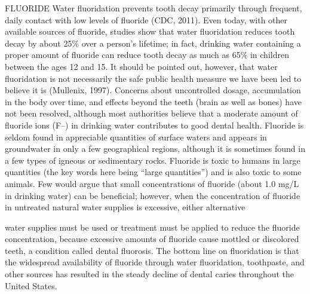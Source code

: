 \documentclass{article}
\begin{document}
FLUORIDE Water fluoridation prevents tooth decay primarily through
frequent, daily contact with low levels of fluoride (CDC, 2011). Even
today, with other available sources of fluoride, studies show that water
fluoridation reduces tooth decay by about 25\% over a person's lifetime;
in fact, drinking water containing a proper amount of fluoride can
reduce tooth decay as much as 65\% in children between the ages 12 and
15. It should be pointed out, however, that water fluoridation is not
necessarily the safe public health measure we have been led to believe
it is (Mullenix, 1997). Concerns about uncontrolled dosage, accumulation
in the body over time, and effects beyond the teeth (brain as well as
bones) have not been resolved, although most authorities believe that a
moderate amount of fluoride ions (F--) in drinking water contributes to
good dental health. Fluoride is seldom found in appreciable quantities
of surface waters and appears in groundwater in only a few geographical
regions, although it is sometimes found in a few types of igneous or
sedimentary rocks. Fluoride is toxic to humans in large quantities (the
key words here being ``large quantities'') and is also toxic to some
animals. Few would argue that small concentrations of fluoride (about
1.0 mg/L in drinking water) can be beneficial; however, when the
concentration of fluoride in untreated natural water supplies is
excessive, either alternative

water supplies must be used or treatment must be applied to reduce the
fluoride concentration, because excessive amounts of fluoride cause
mottled or discolored teeth, a condition called dental fluorosis. The
bottom line on fluoridation is that the widespread availability of
fluoride through water fluoridation, toothpaste, and other sources has
resulted in the steady decline of dental caries throughout the United
States.
\end{document}
